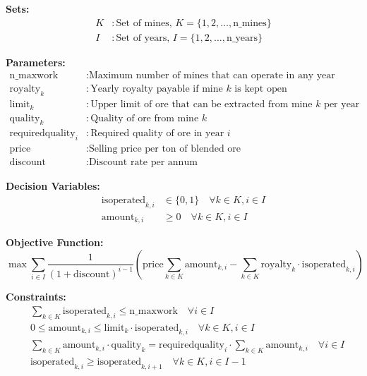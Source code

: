 \documentclass{article}
\begin{document}
\textbf{Sets:}
\begin{align*}
K & : \text{Set of mines, } K = \{1, 2, \ldots, \text{n\_mines}\} \\
I & : \text{Set of years, } I = \{1, 2, \ldots, \text{n\_years}\}
\end{align*}

\textbf{Parameters:}
\begin{align*}
\text{n\_maxwork} & : \text{Maximum number of mines that can operate in any year} \\
\text{royalty}_k & : \text{Yearly royalty payable if mine $k$ is kept open} \\
\text{limit}_k & : \text{Upper limit of ore that can be extracted from mine $k$ per year} \\
\text{quality}_k & : \text{Quality of ore from mine $k$} \\
\text{requiredquality}_i & : \text{Required quality of ore in year $i$} \\
\text{price} & : \text{Selling price per ton of blended ore} \\
\text{discount} & : \text{Discount rate per annum}
\end{align*}

\textbf{Decision Variables:}
\begin{align*}
\text{isoperated}_{k,i} & \in \{0, 1\} \quad \forall k \in K, i \in I \\
\text{amount}_{k,i} & \geq 0 \quad \forall k \in K, i \in I 
\end{align*}

\textbf{Objective Function:}
\[
\max \sum_{i \in I} \frac{1}{(1+\text{discount})^{i-1}} \left( \text{price} \sum_{k \in K} \text{amount}_{k,i} - \sum_{k \in K} \text{royalty}_k \cdot \text{isoperated}_{k,i} \right)
\]

\textbf{Constraints:}
\begin{align*}
& \sum_{k \in K} \text{isoperated}_{k,i} \leq \text{n\_maxwork} \quad \forall i \in I \\
& 0 \leq \text{amount}_{k,i} \leq \text{limit}_k \cdot \text{isoperated}_{k,i} \quad \forall k \in K, i \in I \\
& \sum_{k \in K} \text{amount}_{k,i} \cdot \text{quality}_k = \text{requiredquality}_i \cdot \sum_{k \in K} \text{amount}_{k,i} \quad \forall i \in I \\
& \text{isoperated}_{k,i} \geq \text{isoperated}_{k,i+1} \quad \forall k \in K, i \in I-1 \\
\end{align*}
\end{document}
